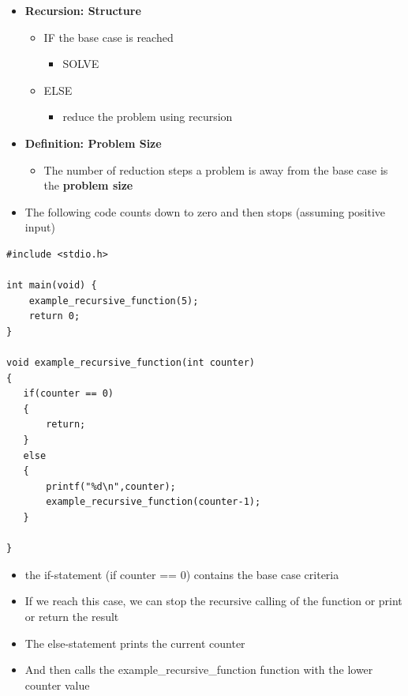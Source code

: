 \documentclass{beamer}
\begin{document}
\begin{frame}

\begin{itemize}
\item {\bfseries Recursion: Structure}

\begin{itemize}
\item IF the base case is reached 

\begin{itemize}
\item SOLVE
\end{itemize}
\item ELSE

\begin{itemize}
\item reduce the problem using recursion
\end{itemize}
\end{itemize}
\item {\bfseries Definition: Problem Size}

\begin{itemize}
\item The number of reduction steps a problem is away from the base case is the \textbf{problem size}
\end{itemize}
\bigskip
\item The following code counts down to zero and then stops (assuming positive input)
\end{itemize}
\end{frame}

\begin{frame}[fragile]
\begin{block}{}
\begin{lstlisting}
#include <stdio.h>

int main(void) {
    example_recursive_function(5);
    return 0;
}

void example_recursive_function(int counter)
{ 
   if(counter == 0)
   {
       return;
   }
   else 
   {
       printf("%d\n",counter);
       example_recursive_function(counter-1);
   }

}

\end{lstlisting}
\end{block}
\end{frame}


\begin{frame}
\begin{itemize}
\item the if-statement (if counter == 0) contains the base case criteria
\item If we reach this case, we can stop the recursive calling of the function or print or return the result
\item The else-statement prints the current counter 
\item And then calls the example\_recursive\_function function with the lower counter value 
\end{itemize}
\end{frame}
\end{document}
